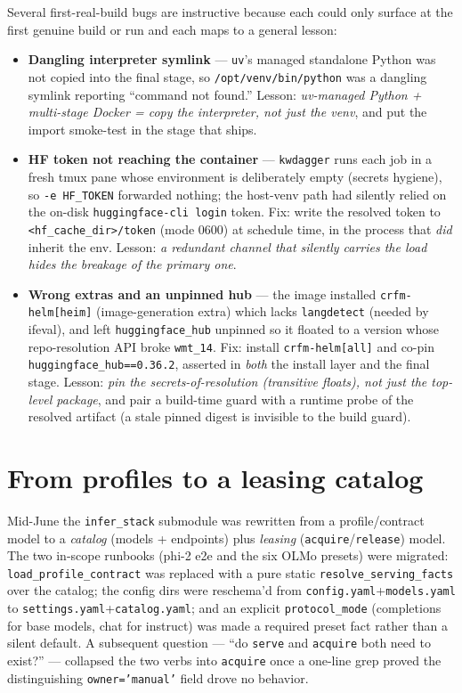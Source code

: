 \documentclass[11pt]{report}
\newcommand{\code}[1]{\texttt{#1}}
\begin{document}
Several first-real-build bugs are instructive because each could only surface at
the first genuine build or run and each maps to a general lesson:

\begin{itemize}[nosep]
  \item \textbf{Dangling interpreter symlink} --- \code{uv}'s managed standalone
        Python was not copied into the final stage, so \code{/opt/venv/bin/python}
        was a dangling symlink reporting ``command not found.'' Lesson:
        \emph{uv-managed Python + multi-stage Docker = copy the interpreter, not
        just the venv}, and put the import smoke-test in the stage that ships.
  \item \textbf{HF token not reaching the container} --- \code{kwdagger} runs each
        job in a fresh tmux pane whose environment is deliberately empty (secrets
        hygiene), so \code{-e HF\_TOKEN} forwarded nothing; the host-venv path had
        silently relied on the on-disk \code{huggingface-cli login} token. Fix:
        write the resolved token to \code{<hf\_cache\_dir>/token} (mode 0600) at
        schedule time, in the process that \emph{did} inherit the env. Lesson:
        \emph{a redundant channel that silently carries the load hides the breakage
        of the primary one}.
  \item \textbf{Wrong extras and an unpinned hub} --- the image installed
        \code{crfm-helm[heim]} (image-generation extra) which lacks
        \code{langdetect} (needed by ifeval), and left \code{huggingface\_hub}
        unpinned so it floated to a version whose repo-resolution API broke
        \code{wmt\_14}. Fix: install \code{crfm-helm[all]} and co-pin
        \code{huggingface\_hub==0.36.2}, asserted in \emph{both} the install layer
        and the final stage. Lesson: \emph{pin the secrets-of-resolution
        (transitive floats), not just the top-level package}, and pair a build-time
        guard with a runtime probe of the resolved artifact (a stale pinned digest
        is invisible to the build guard).
\end{itemize}

\section{From profiles to a leasing catalog}

Mid-June the \code{infer\_stack} submodule was rewritten from a
profile/contract model to a \emph{catalog} (models + endpoints) plus \emph{leasing}
(\code{acquire}/\code{release}) model. The two in-scope runbooks (phi-2 e2e and the
six OLMo presets) were migrated: \code{load\_profile\_contract} was replaced with a
pure static \code{resolve\_serving\_facts} over the catalog; the config dirs were
reschema'd from \code{config.yaml}+\code{models.yaml} to
\code{settings.yaml}+\code{catalog.yaml}; and an explicit \code{protocol\_mode}
(completions for base models, chat for instruct) was made a required preset fact
rather than a silent default. A subsequent question --- ``do \code{serve} and
\code{acquire} both need to exist?'' --- collapsed the two verbs into
\code{acquire} once a one-line grep proved the distinguishing \code{owner='manual'}
field drove no behavior.
\end{document}
